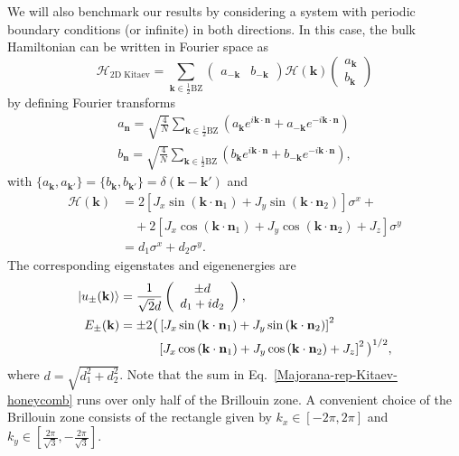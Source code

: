 \documentclass[aps,prb,twocolumn,superscriptaddress,groupedaddress]{revtex4}
\begin{document}
We will also benchmark our results by considering a system with periodic boundary conditions (or infinite) in both directions.
In this case, the bulk Hamiltonian can be written in Fourier space as~\cite{Thakurathi:2014}
%
\begin{equation}
\mathcal{H}_{\text{2D Kitaev}} = \sum_{\mathbf{k} \in \frac{1}{2} \text{BZ}} \left( \begin{array}{cc} a_{-\mathbf{k}} & b_{-\mathbf{k}} \end{array} \right) \mathcal{H}(\mathbf{k}) 
\left( \begin{array}{c} a_{\mathbf{k}} \\ b_{\mathbf{k}} \end{array} \right) 
\label{Majorana-rep-Kitaev-honeycomb}
\end{equation}
%
by defining Fourier transforms
%
\begin{align}
a_{\mathbf{n}} = \sqrt{\frac{4}{N}} \sum_{\mathbf{k} \in \frac{1}{2} \mathrm{BZ}} \left( a_{\mathbf{k}} e^{i \mathbf{k} \cdot \mathbf{n}} + a_{-\mathbf{k}} e^{-i\mathbf{k} \cdot \mathbf{n}} \right) \\
b_{\mathbf{n}} = \sqrt{\frac{4}{N}} \sum_{\mathbf{k} \in \frac{1}{2} \mathrm{BZ}} \left( b_{\mathbf{k}} e^{i \mathbf{k} \cdot \mathbf{n}} + b_{-\mathbf{k}} e^{-i\mathbf{k} \cdot \mathbf{n}} \right),
\end{align}
%
with $\{ a_{\mathbf{k}}, a_{\mathbf{k}'} \}= \{ b_{\mathbf{k}}, b_{\mathbf{k}'} \} = \delta(\mathbf{k} - \mathbf{k}')$ and 
%
\begin{align}
\mathcal{H}(\mathbf{k}) &=  2 \left[ J_x \sin \left( \mathbf{k} \cdot \mathbf{n}_1 \right) + J_y \sin \left( \mathbf{k} \cdot \mathbf{n}_2 \right) \right]  \sigma^x + \nonumber \\
& \quad + 2 \left[ J_x \cos \left( \mathbf{k} \cdot \mathbf{n}_1 \right) + J_y \cos \left( \mathbf{k} \cdot \mathbf{n}_2 \right) + J_z \right]  \sigma^y
\nonumber \\
&=d_{1}\sigma^{x}+d_{2}\sigma^{y}.
\label{bulk-Ham}
\end{align}
The corresponding eigenstates and eigenenergies are
%
\begin{align}
|u_{\pm}({\bf k})\rangle &=\frac{1}{\sqrt{2}d}\left(\begin{array}{c}
\pm d \\
d_{1}+id_{2}
\end{array}\right),
\nonumber \\
E_{\pm}(\mathbf{k}) &= \pm 2 \big( \left[  J_x \sin \left( \mathbf{k} \cdot \mathbf{n}_1 \right) + J_y \sin \left( \mathbf{k} \cdot \mathbf{n}_2 \right) \right]^2  \nonumber \\
& \qquad \quad \left[ J_x \cos \left( \mathbf{k} \cdot \mathbf{n}_1 \right) + J_y \cos \left( \mathbf{k} \cdot \mathbf{n}_2 \right) + J_z \right]^2  \big)^{1/2},
\label{Kitaev-honeycomb-disp}
\end{align}
%
where $d=\sqrt{d_{1}^{2}+d_{2}^{2}}$. Note that the sum in Eq.~\eqref{Majorana-rep-Kitaev-honeycomb} runs over only half of the Brillouin zone. 
A convenient choice of the Brillouin zone consists of the rectangle given by $k_x \in [-2\pi, 2\pi]$ and $k_y \in [ \frac{2\pi}{\sqrt{3}}, -\frac{2\pi}{\sqrt{3}}]$.
\end{document}
